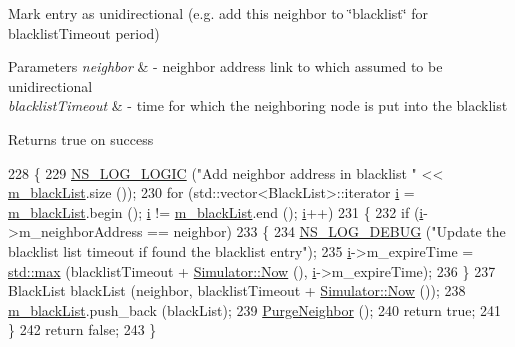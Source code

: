 Mark entry as unidirectional (e.\+g. add this neighbor to \char`\"{}blacklist\char`\"{} for blacklist\+Timeout period) 


\begin{DoxyParams}{Parameters}
{\em neighbor} & -\/ neighbor address link to which assumed to be unidirectional \\
\hline
{\em blacklist\+Timeout} & -\/ time for which the neighboring node is put into the blacklist \\
\hline
\end{DoxyParams}
\begin{DoxyReturn}{Returns}
true on success 
\end{DoxyReturn}

\begin{DoxyCode}
228 \{
229   \hyperlink{group__logging_ga88acd260151caf2db9c0fc84997f45ce}{NS\_LOG\_LOGIC} (\textcolor{stringliteral}{"Add neighbor address in blacklist "} << \hyperlink{classns3_1_1dsr_1_1DsrRreqTable_a7d696cdc50c5b521641cbf03192358aa}{m\_blackList}.size ());
230   \textcolor{keywordflow}{for} (std::vector<BlackList>::iterator \hyperlink{bernuolliDistribution_8m_a6f6ccfcf58b31cb6412107d9d5281426}{i} = \hyperlink{classns3_1_1dsr_1_1DsrRreqTable_a7d696cdc50c5b521641cbf03192358aa}{m\_blackList}.begin (); \hyperlink{bernuolliDistribution_8m_a6f6ccfcf58b31cb6412107d9d5281426}{i} != 
      \hyperlink{classns3_1_1dsr_1_1DsrRreqTable_a7d696cdc50c5b521641cbf03192358aa}{m\_blackList}.end (); \hyperlink{bernuolliDistribution_8m_a6f6ccfcf58b31cb6412107d9d5281426}{i}++)
231     \{
232       \textcolor{keywordflow}{if} (\hyperlink{bernuolliDistribution_8m_a6f6ccfcf58b31cb6412107d9d5281426}{i}->m\_neighborAddress == neighbor)
233         \{
234           \hyperlink{group__logging_ga413f1886406d49f59a6a0a89b77b4d0a}{NS\_LOG\_DEBUG} (\textcolor{stringliteral}{"Update the blacklist list timeout if found the blacklist entry"});
235           \hyperlink{bernuolliDistribution_8m_a6f6ccfcf58b31cb6412107d9d5281426}{i}->m\_expireTime = \hyperlink{80211b_8c_affe776513b24d84b39af8ab0930fef7f}{std::max} (blacklistTimeout + \hyperlink{classns3_1_1Simulator_ac3178fa975b419f7875e7105be122800}{Simulator::Now} (), 
      \hyperlink{bernuolliDistribution_8m_a6f6ccfcf58b31cb6412107d9d5281426}{i}->m\_expireTime);
236         \}
237       BlackList blackList (neighbor, blacklistTimeout + \hyperlink{classns3_1_1Simulator_ac3178fa975b419f7875e7105be122800}{Simulator::Now} ());
238       \hyperlink{classns3_1_1dsr_1_1DsrRreqTable_a7d696cdc50c5b521641cbf03192358aa}{m\_blackList}.push\_back (blackList);
239       \hyperlink{classns3_1_1dsr_1_1DsrRreqTable_aca6a498c94d434706539b867033e919e}{PurgeNeighbor} ();
240       \textcolor{keywordflow}{return} \textcolor{keyword}{true};
241     \}
242   \textcolor{keywordflow}{return} \textcolor{keyword}{false};
243 \}
\end{DoxyCode}


